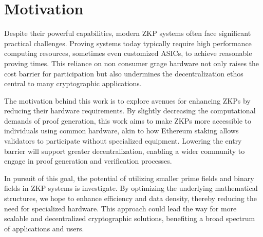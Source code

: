 \chapter{Motivation}

Despite their powerful capabilities, modern ZKP systems often face significant
practical challenges. Proving systems today typically require high performance
computing resources, sometimes even customized ASICs, to achieve reasonable
proving times. This reliance on non consumer grage hardware not only raises
the cost barrier for participation but also undermines the decentralization
ethos central to many cryptographic applications.

The motivation behind this work is to explore avenues for enhancing ZKPs by
reducing their hardware requirements. By slightly decreasing the computational
demands of proof generation, this work aims to make ZKPs more accessible to
individuals using common hardware, akin to how Ethereum staking allows
validators to participate without specialized equipment. Lowering the entry
barrier will support greater decentralization, enabling a wider community to
engage in proof generation and verification processes.

In pursuit of this goal, the potential of utilizing smaller prime fields and
binary fields in ZKP systems is investigate. By optimizing the underlying
mathematical structures, we hope to enhance efficiency and data density,
thereby reducing the need for specialized hardware. This approach could lead
the way for more scalable and decentralized cryptographic solutions,
benefiting a broad spectrum of applications and users.
